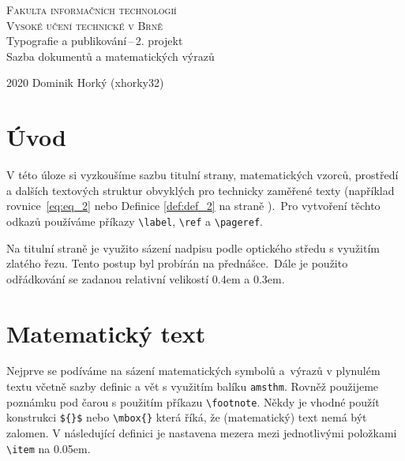 \documentclass[a4paper, twocolumn, 11pt]{article}
\date{}
\theoremstyle{definition}
\begin{document}
\begin{titlepage}

\begin{center}
\LARGE
\textsc{\Huge Fakulta informačních technologií\\[0.3em]
Vysoké učení technické v Brně}\\
Typografie a publikování\,–\,2. projekt\\[0.1em]
Sazba dokumentů a matematických výrazů
\end{center}
{\Large 2020 \hfill Dominik Horký (xhorky32)}

\end{titlepage}

\section*{Úvod}

V této úloze si vyzkoušíme sazbu titulní strany, ma\-te\-ma\-tic\-kých vzorců, prostředí a dalších textových struktur obvyklých pro technicky zaměřené texty (například rovnice~\eqref{eq:eq_2}
nebo Definice \ref{def:def_2} na straně \pageref{def:def_2}).\ Pro vytvoření těchto odkazů
používáme příkazy \verb|\label|, \verb|\ref| a \verb|\pageref|.

Na titulní straně je využito sázení nadpisu podle op\-ti\-cké\-ho středu s využitím zlatého řezu. Tento postup byl
probírán na přednášce.\ Dále je použito odřádkování se
zadanou relativní velikostí 0.4em a 0.3em.

\section{Matematický text}

Nejprve se podíváme na sázení matematických symbolů a~výrazů v plynulém textu včetně sazby definic a vět s využitím balíku \verb|amsthm|. Rovněž použijeme poznámku pod
čarou s použitím příkazu \verb|\footnote|. Někdy je vhodné
použít konstrukci \verb|${}$| nebo \verb|\mbox{}| která říká, že
(matematický) text nemá být zalomen. V následující definici je nastavena mezera mezi jednotlivými položkami
\verb|\item| na 0.05em.\setlength{\parskip}{1em}
\end{document}
